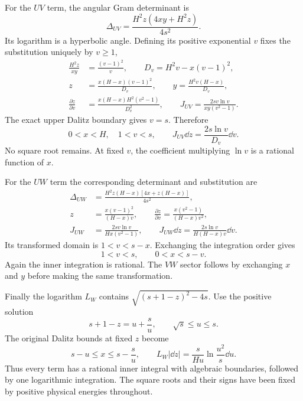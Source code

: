 For the $UV$ term, the angular Gram determinant is
\begin{equation}
 \Delta_{UV}=\frac{H^2z(4xy+H^2z)}{4s^2}.
\end{equation}
Its logarithm is a hyperbolic angle. Defining its positive
exponential $v$ fixes the substitution uniquely by $v\geq1$,
\begin{align}
 \frac{H^2z}{xy}&=\frac{(v-1)^2}{v},\qquad
 D_v=H^2v-x(v-1)^2,\\
 z&=\frac{x(H-x)(v-1)^2}{D_v},\qquad
 y=\frac{H^2v(H-x)}{D_v},\\
 \frac{\partial z}{\partial v}
 &=\frac{x(H-x)H^2(v^2-1)}{D_v^2},\qquad
 J_{UV}=\frac{2sv\ln v}{xy(v^2-1)}.
\end{align}
The exact upper Dalitz boundary gives $v=s$. Therefore
\begin{equation}
 0<x<H,\quad1<v<s,\qquad
 J_{UV}\dd z=\frac{2s\ln v}{D_v}\dd v.
 \label{eq:comp-real-UV-rational}
\end{equation}
No square root remains. At fixed $v$, the coefficient multiplying
$\ln v$ is a rational function of $x$.

For the $UW$ term the corresponding determinant and substitution
are
\begin{align}
 \Delta_{UW}&=\frac{H^2z(H-x)[4x+z(H-x)]}{4s^2},\\
 z&=\frac{x(v-1)^2}{(H-x)v},\qquad
 \frac{\partial z}{\partial v}=\frac{x(v^2-1)}{(H-x)v^2},\\
 J_{UW}&=\frac{2sv\ln v}{Hx(v^2-1)},\qquad
 J_{UW}\dd z=\frac{2s\ln v}{H(H-x)v}\dd v.
\end{align}
Its transformed domain is $1<v<s-x$. Exchanging the integration
order gives
\begin{equation}
 1<v<s,\qquad0<x<s-v.
 \label{eq:comp-real-UW-rational}
\end{equation}
Again the inner integration is rational. The $VW$ sector follows
by exchanging $x$ and $y$ before making the same transformation.

Finally the logarithm $L_W$ contains
$\sqrt{(s+1-z)^2-4s}$. Use the positive solution
\begin{equation}
 s+1-z=u+\frac{s}{u},\qquad\sqrt{s}\leq u\leq s.
\end{equation}
The original Dalitz bounds at fixed $z$ become
\begin{equation}
 s-u\leq x\leq s-\frac{s}{u},\qquad
 L_W|\dd z|=\frac{s}{Hu}\ln\frac{u^2}{s}\dd u.
 \label{eq:comp-real-W-rational}
\end{equation}
Thus every term has a rational inner integral with algebraic
boundaries, followed by one logarithmic integration. The square
roots and their signs have been fixed by positive physical energies
throughout.

